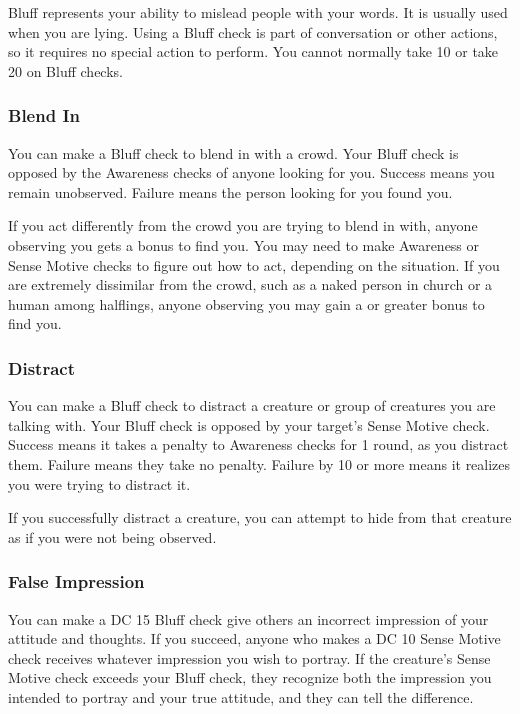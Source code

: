 Bluff represents your ability to mislead people with your words. It is usually used when you are lying. Using a Bluff check is part of conversation or other actions, so it requires no special action to perform. You cannot normally take 10 or take 20 on Bluff checks.

\subsubsection{Blend In}
You can make a Bluff check to blend in with a crowd. Your Bluff check is opposed by the Awareness checks of anyone looking for you. Success means you remain unobserved. Failure means the person looking for you found you.

If you act differently from the crowd you are trying to blend in with, anyone observing you gets a  bonus to find you. You may need to make Awareness or Sense Motive checks to figure out how to act, depending on the situation. If you are extremely dissimilar from the crowd, such as a naked person in church or a human among halflings, anyone observing you may gain a  or greater bonus to find you. 

\subsubsection{Distract}
You can make a Bluff check to distract a creature or group of creatures you are talking with. Your Bluff check is opposed by your target's Sense Motive check. Success means it takes a  penalty to Awareness checks for 1 round, as you distract them. Failure means they take no penalty. Failure by 10 or more means it realizes you were trying to distract it.

If you successfully distract a creature, you can attempt to hide from that creature as if you were not being observed.

\subsubsection{False Impression}
You can make a DC 15 Bluff check give others an incorrect impression of your attitude and thoughts. If you succeed, anyone who makes a DC 10 Sense Motive check receives whatever impression you wish to portray. If the creature's Sense Motive check exceeds your Bluff check, they recognize both the impression you intended to portray and your true attitude, and they can tell the difference.

